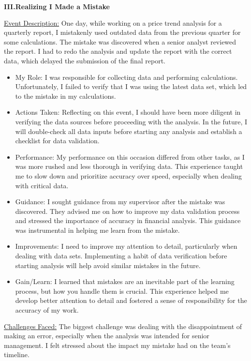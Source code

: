 \documentclass{article}
\begin{document}
\begin{titlepage}
\begin{titlepage}
\begin{flushleft}
\begin{flushleft}
\textbf{III.Realizing I Made a Mistake}
\vspace{0.2cm}

\underline{Event Description:}
One day, while working on a price trend analysis for a quarterly report, I mistakenly used outdated data from the previous quarter for some calculations. The mistake was discovered when a senior analyst reviewed the report. I had to redo the analysis and update the report with the correct data, which delayed the submission of the final report.
\vspace{0.15cm}

\begin{itemize}
    \item 
    My Role:
I was responsible for collecting data and performing calculations. Unfortunately, I failed to verify that I was using the latest data set, which led to the mistake in my calculations.
\item 
Actions Taken:
Reflecting on this event, I should have been more diligent in verifying the data sources before proceeding with the analysis. In the future, I will double-check all data inputs before starting any analysis and establish a checklist for data validation.
\item 
Performance:
My performance on this occasion differed from other tasks, as I was more rushed and less thorough in verifying data. This experience taught me to slow down and prioritize accuracy over speed, especially when dealing with critical data.
\item 
Guidance:
I sought guidance from my supervisor after the mistake was discovered. They advised me on how to improve my data validation process and stressed the importance of accuracy in financial analysis. This guidance was instrumental in helping me learn from the mistake.
\item
Improvements:
I need to improve my attention to detail, particularly when dealing with data sets. Implementing a habit of data verification before starting analysis will help avoid similar mistakes in the future.
\item
Gain/Learn:
I learned that mistakes are an inevitable part of the learning process, but how you handle them is crucial. This experience helped me develop better attention to detail and fostered a sense of responsibility for the accuracy of my work.
\end{itemize}
\underline{Challenges Faced:}
The biggest challenge was dealing with the disappointment of making an error, especially when the analysis was intended for senior management. I felt stressed about the impact my mistake had on the team's timeline.
\vspace{0.15cm}


\end{flushleft}
\end{flushleft}
\end{titlepage}
\end{titlepage}
\end{document}
